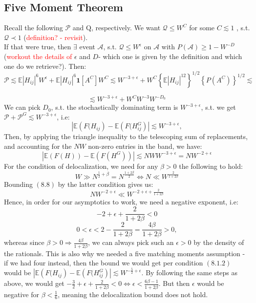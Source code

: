 \documentclass[11pt]{article}
\begin{document}
\subsection{Five Moment Theorem}
Recall the following  $\mathcal{P}$ and $\mathrm{Q}$, respectively. We want $\mathcal{Q}\leq W^C$ for some $C \lesssim 1$ , s.t. $\mathcal{Q}\prec 1$ (\textcolor{red}{definition? - revisit}). \\

If that were true, then $\exists$ event $\mathcal{A}$, s.t. $\mathcal{Q}\leq W^\epsilon$ on $\mathcal{A}$ with $P(\mathcal{A})\geq 1-W^{-D}$ (\textcolor{red}{workout the details of }$\epsilon$ and $D$- which one is given by the definition and which one do we retrieve?). Then: 
$$\mathcal{P}\lesssim \mathbb{E}|H_{ij}|^6W^\epsilon + \mathbb{E}|H_{ij}|^6 \mathbf{1}\left[{A^C}\right]W^C\lesssim W^{-3+\epsilon} + W^C \left\{\mathbb{E}|H_{ij}|^{12}\right\}^{1/2} \left\{P(A^C)\right\}^{1/2}\lesssim$$

$$\lesssim W^{-3+\epsilon} + W^C W^{-3} W^{-D_0}$$
We can pick $D_0$, s.t. the stochastically dominating term is $W^{-3+\epsilon}$, s.t. we get $\mathcal{P}+\mathcal{P}^G\lesssim W^{-3+\epsilon}$, i.e: $$\left\vert \mathbb{E}\left(F(H_{ij}\right) - \mathbb{E}\left(F(H_{ij}^G\right)\right\vert\lesssim W^{-3+\epsilon},$$
Then, by applying the triangle inequality to the telescoping sum of replacements, and accounting for the $NW$ non-zero entries in the band, we have: 
 \begin{equation*} \left\vert \mathbb{E}\left(F(H)\right) - \mathbb{E}\left(F(H^G)\right)\right\vert\lesssim NWW^{-3+\epsilon} = NW^{-2+\epsilon}\tag{8.8}
 \end{equation*}
\noindent For the condition of delocalization, we need for any $\beta>0$ the following to hold:
 $$W\gg N^{\frac{1}{2}+\beta} = N^{\frac{1+2\beta}{2}}\Leftrightarrow N\ll W^{\frac{2}{1+2\beta}}$$
\noindent Bounding $(8.8)$ by the latter condition gives us:
  $$NW^{-2+\epsilon}\ll W^{-2+\epsilon+\frac{2}{1+2\beta}}$$
\noindent Hence, in order for our asymptotics to work, we need a negative exponent, i.e: $$-2+\epsilon + \frac{2}{1+2\beta}<0$$
  $$0<\epsilon <2-\frac{2}{1+2\beta} = \frac{4\beta}{1+2\beta}>0,$$
  whereas since $\beta>0\Rightarrow \frac{4\beta}{1+2\beta}$, we can always pick such an $\epsilon>0$ by the density of the rationals. This is also why we needed a five matching moments assumption - if we had four instead, then the bound we would get per condition $(8.1.2)$ would be $\left\vert \mathbb{E}\left(F(H_{ij}\right) - \mathbb{E}\left(F(H_{ij}^G\right)\right\vert\lesssim W^{-\frac{5}{2}+\epsilon}$. By following the same steps as above, we would get $-\frac{3}{2}+\epsilon+\frac{2}{1+2\beta}<0\Leftrightarrow \epsilon< \frac{6\beta-1}{1+2\beta}$.  But then $\epsilon$ would be negative for $\beta<\frac{1}{6}$, meaning the delocalization bound does not hold. 
  
\end{document}
